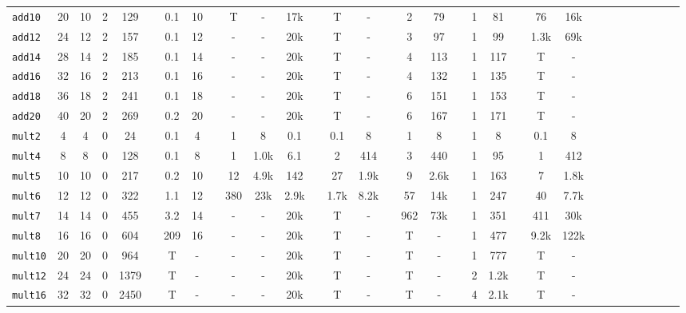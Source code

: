 \documentclass[conference]{IEEEtran}
\begin{document}
\begin{table*}
\begin{center}
{\begin{tabular}{lccccccccccccccccccccccccccccccc}
\texttt{add10}     &20&10&2 &129 &&0.1  &10   &&T    &-    &17k &&T    &-    &&2    &79   &&1    &81   &&76   & 16k  \\
\texttt{add12}     &24&12&2 &157 &&0.1  &12   &&-    &-    &20k &&T    &-    &&3    &97   &&1    &99   &&1.3k & 69k  \\
\texttt{add14}     &28&14&2 &185 &&0.1  &14   &&-    &-    &20k &&T    &-    &&4    &113  &&1    &117  &&T    & -    \\
\texttt{add16}     &32&16&2 &213 &&0.1  &16   &&-    &-    &20k &&T    &-    &&4    &132  &&1    &135  &&T    & -    \\
\texttt{add18}     &36&18&2 &241 &&0.1  &18   &&-    &-    &20k &&T    &-    &&6    &151  &&1    &153  &&T    & -    \\
\texttt{add20}     &40&20&2 &269 &&0.2  &20   &&-    &-    &20k &&T    &-    &&6    &167  &&1    &171  &&T    & -    \\
\cmidrule{1-5}
\cmidrule{7-8}
\cmidrule{10-12}
\cmidrule{14-15}
\cmidrule{17-18}
\cmidrule{20-21}
\cmidrule{23-24}
 \texttt{mult2}     &4 &4 &0 &24  &&0.1  &4    &&1    &8    &0.1    &&0.1  &8    &&1    &8    &&1    &8    &&0.1  & 8    \\
 \texttt{mult4}     &8 &8 &0 &128 &&0.1  &8    &&1    &1.0k &6.1    &&2    &414  &&3    &440  &&1    &95   &&1    & 412  \\
 \texttt{mult5}     &10&10&0 &217 &&0.2  &10   &&12   &4.9k &142    &&27   &1.9k &&9    &2.6k &&1    &163  &&7    & 1.8k \\
 \texttt{mult6}     &12&12&0 &322 &&1.1  &12   &&380  &23k  &2.9k   &&1.7k &8.2k &&57   &14k  &&1    &247  &&40   & 7.7k \\
 \texttt{mult7}     &14&14&0 &455 &&3.2  &14   &&-    &-    &20k &&T    &-    &&962  &73k  &&1    &351  &&411  & 30k  \\
 \texttt{mult8}     &16&16&0 &604 &&209  &16   &&-    &-    &20k &&T    &-    &&T    &-    &&1    &477  &&9.2k & 122k \\
\texttt{mult10}    &20&20&0 &964 &&T    &-    &&-    &-    &20k &&T    &-    &&T    &-    &&1    &777  &&T    & -    \\
\texttt{mult12}    &24&24&0 &1379&&T    &-    &&-    &-    &20k &&T    &-    &&T    &-    &&2    &1.2k &&T    & -    \\
\texttt{mult16}    &32&32&0 &2450&&T    &-    &&-    &-    &20k &&T    &-    &&T    &-    &&4    &2.1k &&T    & -    \\
\cmidrule{1-5}
\cmidrule{7-8}
\cmidrule{10-12}
\cmidrule{14-15}
\cmidrule{17-18}

\end{tabular}}
\end{center}
\end{table*}
\end{document}
